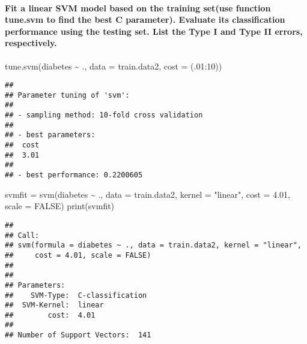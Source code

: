\documentclass[
]{article}
\newenvironment{Shaded}{\begin{snugshade}}{\end{snugshade}}
\newcommand{\AttributeTok}[1]{\textcolor[rgb]{0.77,0.63,0.00}{#1}}
\newcommand{\ConstantTok}[1]{\textcolor[rgb]{0.00,0.00,0.00}{#1}}
\newcommand{\DecValTok}[1]{\textcolor[rgb]{0.00,0.00,0.81}{#1}}
\newcommand{\FloatTok}[1]{\textcolor[rgb]{0.00,0.00,0.81}{#1}}
\newcommand{\FunctionTok}[1]{\textcolor[rgb]{0.00,0.00,0.00}{#1}}
\newcommand{\NormalTok}[1]{#1}
\newcommand{\OtherTok}[1]{\textcolor[rgb]{0.56,0.35,0.01}{#1}}
\newcommand{\SpecialCharTok}[1]{\textcolor[rgb]{0.00,0.00,0.00}{#1}}
\newcommand{\StringTok}[1]{\textcolor[rgb]{0.31,0.60,0.02}{#1}}
\begin{document}
\hypertarget{fit-a-linear-svm-model-based-on-the-training-setuse-function-tune.svm-to-find-the-best-c-parameter.-evaluate-its-classification-performance-using-the-testing-set.-list-the-type-i-and-type-ii-errors-respectively.}{%
\paragraph{Fit a linear SVM model based on the training set(use function
tune.svm to find the best C parameter). Evaluate its classification
performance using the testing set. List the Type I and Type II errors,
respectively.}\label{fit-a-linear-svm-model-based-on-the-training-setuse-function-tune.svm-to-find-the-best-c-parameter.-evaluate-its-classification-performance-using-the-testing-set.-list-the-type-i-and-type-ii-errors-respectively.}}

\begin{Shaded}
\begin{Highlighting}[]
\FunctionTok{tune.svm}\NormalTok{(diabetes }\SpecialCharTok{\textasciitilde{}}\NormalTok{ ., }\AttributeTok{data =}\NormalTok{ train.data2, }\AttributeTok{cost =}\NormalTok{ (.}\DecValTok{01}\SpecialCharTok{:}\DecValTok{10}\NormalTok{))}
\end{Highlighting}
\end{Shaded}

\begin{verbatim}
## 
## Parameter tuning of 'svm':
## 
## - sampling method: 10-fold cross validation 
## 
## - best parameters:
##  cost
##  3.01
## 
## - best performance: 0.2200605
\end{verbatim}

\begin{Shaded}
\begin{Highlighting}[]
\NormalTok{svmfit }\OtherTok{=} \FunctionTok{svm}\NormalTok{(diabetes }\SpecialCharTok{\textasciitilde{}}\NormalTok{ ., }\AttributeTok{data =}\NormalTok{ train.data2, }\AttributeTok{kernel =} \StringTok{"linear"}\NormalTok{, }\AttributeTok{cost =} \FloatTok{4.01}\NormalTok{, }\AttributeTok{scale =} \ConstantTok{FALSE}\NormalTok{)}
\FunctionTok{print}\NormalTok{(svmfit)}
\end{Highlighting}
\end{Shaded}

\begin{verbatim}
## 
## Call:
## svm(formula = diabetes ~ ., data = train.data2, kernel = "linear", 
##     cost = 4.01, scale = FALSE)
## 
## 
## Parameters:
##    SVM-Type:  C-classification 
##  SVM-Kernel:  linear 
##        cost:  4.01 
## 
## Number of Support Vectors:  141
\end{verbatim}
\end{document}
